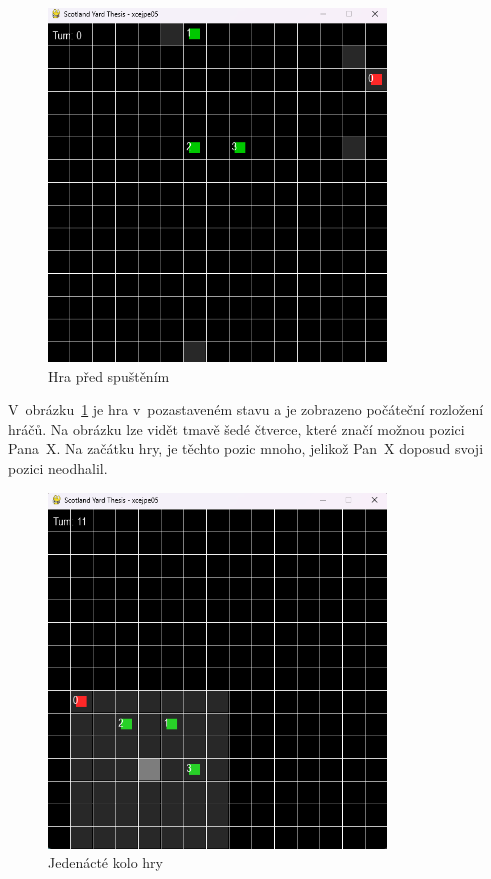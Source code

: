 \begin{figure}[H]
	\centering
	\includegraphics[width=0.8\textwidth]{obrazky-figures/game_0}
    \caption{Hra před spuštěním}
    \label{fig:game_0}
\end{figure}

V~obrázku~\ref{fig:game_0} je hra v~pozastaveném stavu a je zobrazeno počáteční rozložení hráčů.
Na obrázku lze vidět tmavě šedé čtverce, které značí možnou pozici Pana~X\@.
Na začátku hry, je těchto pozic mnoho, jelikož Pan~X doposud svoji pozici neodhalil.

\begin{figure}[H]
	\centering
	\includegraphics[width=0.8\textwidth]{obrazky-figures/game_11}
      \caption{Jedenácté kolo hry}
    \label{fig:game_11}
\end{figure}

